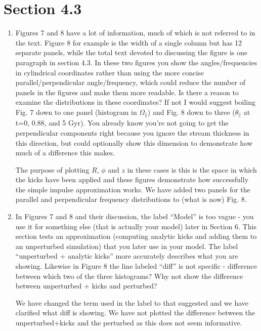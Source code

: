 \documentclass{article}
\begin{document}
\section{Section 4.3}
\begin{enumerate}
\item Figures 7 and 8 have a lot of information, much of which is not referred to in the text.
Figure 8 for example is the width of a single column but has 12 separate panels, while
the total text devoted to discussing the figure is one paragraph in section 4.3. In these
two figures you show the angles/frequencies in cylindrical coordinates rather than using
the more concise parallel/perpendicular angle/frequency, which could reduce the
number of panels in the figures and make them more readable. Is there a reason to
examine the distributions in these coordinates? If not I would suggest boiling Fig. 7
down to one panel (histogram in $\Omega_\parallel$) and Fig. 8 down to three
($\theta_\parallel$ at t=0, 0.88, and 5 Gyr). You already know you’re not going to get the
perpendicular components right because you ignore the stream thickness in this
direction, but could optionally show this dimension to demonstrate how much of a
difference this makes.

{\color{red} The purpose of plotting $R$, $\phi$ and $z$ in these cases is this is the space in which the kicks have been applied and these figures demonstrate how successfully the simple impulse approximation works.  We have added two panels for the parallel and perpendicular frequency distributions to (what is now) Fig. 8.}

\item In Figures 7 and 8 and their discussion, the label “Model” is too vague - you use it for
something else (that is actually your model) later in Section 6. This section tests an
approximation (computing analytic kicks and adding them to an unperturbed simulation)
that you later use in your model. The label “unperturbed + analytic kicks” more
accurately describes what you are showing. Likewise in Figure 8 the line labeled “diff” is
not specific - difference between which two of the three histograms? Why not show the
difference between unperturbed + kicks and perturbed?

{\color{red} We have changed the term used in the label to that suggested and we have clarified what diff is showing. We have not plotted the difference between the unperturbed+kicks and the perturbed as this does not seem informative. }

\end{enumerate}
\end{document}
